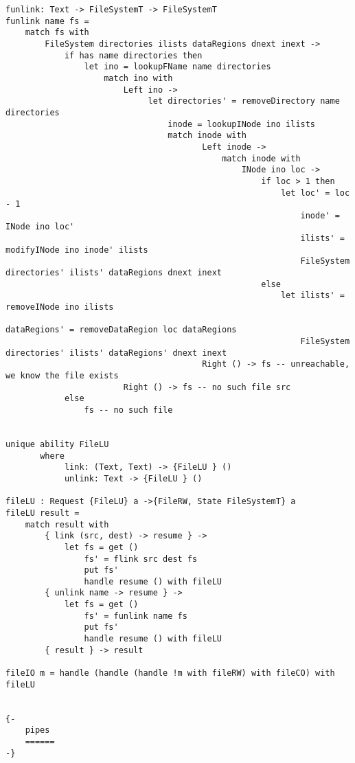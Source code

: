\documentclass[logo,bsc,singlespacing,parskip]{infthesis}
\begin{document}
\begin{lstlisting}[language=unison]
funlink: Text -> FileSystemT -> FileSystemT
funlink name fs =
    match fs with
        FileSystem directories ilists dataRegions dnext inext ->
            if has name directories then
                let ino = lookupFName name directories
                    match ino with
                        Left ino ->
                             let directories' = removeDirectory name directories
                                 inode = lookupINode ino ilists
                                 match inode with
                                        Left inode ->
                                            match inode with
                                                INode ino loc ->
                                                    if loc > 1 then
                                                        let loc' = loc - 1
                                                            inode' = INode ino loc'
                                                            ilists' = modifyINode ino inode' ilists
                                                            FileSystem directories' ilists' dataRegions dnext inext
                                                    else
                                                        let ilists' = removeINode ino ilists
                                                            dataRegions' = removeDataRegion loc dataRegions
                                                            FileSystem directories' ilists' dataRegions' dnext inext
                                        Right () -> fs -- unreachable, we know the file exists
                        Right () -> fs -- no such file src
            else
                fs -- no such file


unique ability FileLU
       where
            link: (Text, Text) -> {FileLU } ()
            unlink: Text -> {FileLU } ()

fileLU : Request {FileLU} a ->{FileRW, State FileSystemT} a
fileLU result =
    match result with
        { link (src, dest) -> resume } ->
            let fs = get ()
                fs' = flink src dest fs
                put fs'
                handle resume () with fileLU
        { unlink name -> resume } ->
            let fs = get ()
                fs' = funlink name fs
                put fs'
                handle resume () with fileLU
        { result } -> result

fileIO m = handle (handle (handle !m with fileRW) with fileCO) with fileLU


{-
    pipes
    ======
-}


\end{lstlisting}
\end{document}

